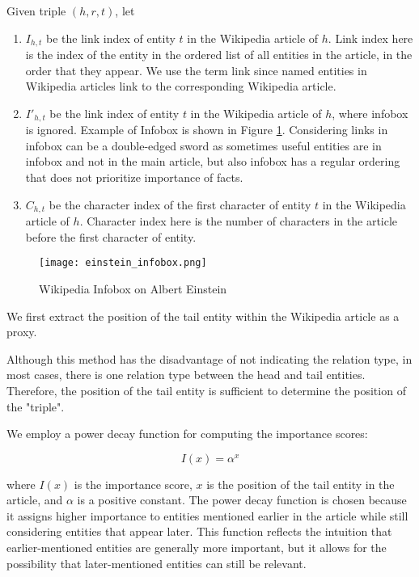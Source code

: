 \documentclass{article}
\begin{document}
Given triple $(h,r,t)$, let
\begin{enumerate}
\item $I_{h,t}$ be the link index of entity $t$ in the Wikipedia article of $h$. Link index here is the index of the entity in the ordered list of all entities in the article, in the order that they appear. We use the term link since named entities in Wikipedia articles link to the corresponding Wikipedia article.
\item $I'_{h,t}$ be the link index of entity $t$ in the Wikipedia article of $h$, where infobox is ignored. Example of Infobox is shown in Figure \ref{img2}. Considering links in infobox can be a double-edged sword as sometimes useful entities are in infobox and not in the main article, but also infobox has a regular ordering that does not prioritize importance of facts.
\item $C_{h,t}$ be the character index of the first character of entity $t$ in the Wikipedia article of $h$. Character index here is the number of characters in the article before the first character of entity.
\end{enumerate}

\begin{figure}[h]
  \centering
  \texttt{[image: einstein\_infobox.png]}
  \caption{Wikipedia Infobox on Albert Einstein}
  \label{img2}
\end{figure}

We first extract the position of the tail entity within the Wikipedia article as a proxy.

Although this method has the disadvantage of not indicating the relation type, in most cases, there is one relation type between the head and tail entities. Therefore, the position of the tail entity is sufficient to determine the position of the "triple".

We employ a power decay function for computing the importance scores:

\begin{equation}
      I(x) = \alpha^x
\end{equation}

where $I(x)$ is the importance score, $x$ is the position of the tail entity in the article, and $\alpha$ is a positive constant. The power decay function is chosen because it assigns higher importance to entities mentioned earlier in the article while still considering entities that appear later. This function reflects the intuition that earlier-mentioned entities are generally more important, but it allows for the possibility that later-mentioned entities can still be relevant.
\end{document}
